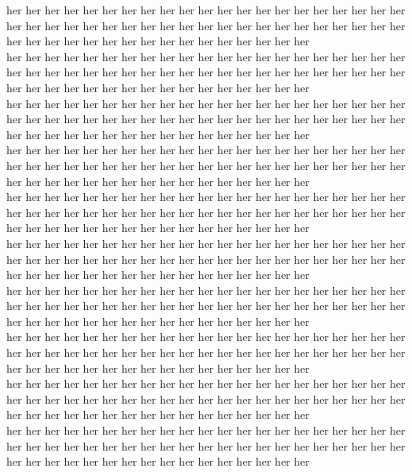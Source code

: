 her her her her her her her her her her her her her her her her her her her her her her her her her her her her her her her her her her her her her her her her her her her her her her her her her her her her her her her her her her\\
her her her her her her her her her her her her her her her her her her her her her her her her her her her her her her her her her her her her her her her her her her her her her her her her her her her her her her her her her her\\
her her her her her her her her her her her her her her her her her her her her her her her her her her her her her her her her her her her her her her her her her her her her her her her her her her her her her her her her her her\\
her her her her her her her her her her her her her her her her her her her her her her her her her her her her her her her her her her her her her her her her her her her her her her her her her her her her her her her her her her\\
her her her her her her her her her her her her her her her her her her her her her her her her her her her her her her her her her her her her her her her her her her her her her her her her her her her her her her her her her her\\
her her her her her her her her her her her her her her her her her her her her her her her her her her her her her her her her her her her her her her her her her her her her her her her her her her her her her her her her her her\\
her her her her her her her her her her her her her her her her her her her her her her her her her her her her her her her her her her her her her her her her her her her her her her her her her her her her her her her her her her\\
her her her her her her her her her her her her her her her her her her her her her her her her her her her her her her her her her her her her her her her her her her her her her her her her her her her her her her her her her her\\
her her her her her her her her her her her her her her her her her her her her her her her her her her her her her her her her her her her her her her her her her her her her her her her her her her her her her her her her her her\\
her her her her her her her her her her her her her her her her her her her her her her her her her her her her her her her her her her her her her her her her her her her her her her her her her her her her her her her her her her\\
